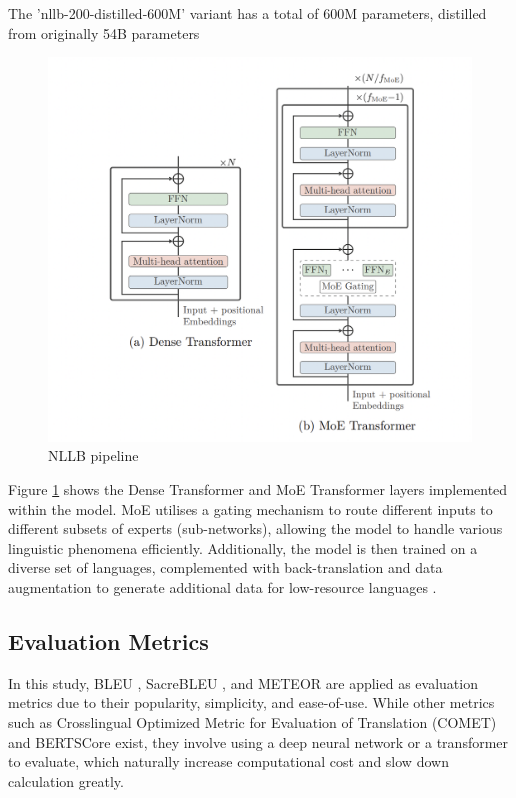 \documentclass[a4paper, 11pt]{article}
\begin{document}
The 'nllb-200-distilled-600M' variant has a total of 600M parameters, distilled from originally 54B parameters \cite{nllb200-2020}

\begin{figure}[htbp]
    \centering
    \includegraphics[width=0.7\linewidth]{images/nllb.png}
    \caption{NLLB pipeline \cite{nllb200-2020}}
    \label{fig:nllb}
\end{figure}

Figure \ref{fig:nllb} shows the Dense Transformer and MoE Transformer layers implemented within the model. MoE \cite{masoudnia-2012-moe} utilises a gating mechanism to route different inputs to different subsets of experts (sub-networks), allowing the model to handle various linguistic phenomena efficiently. Additionally, the model is then trained on a diverse set of languages, complemented with back-translation and data augmentation to generate additional data for low-resource languages \cite{nllb200-2020}.



\subsection{Evaluation Metrics}

In this study, BLEU \cite{papieni-2002-bleu}, SacreBLEU \cite{post-2018-sacrebleu}, and METEOR \cite{lavie-2007-meteor} are applied as evaluation metrics due to their popularity, simplicity, and ease-of-use. While other metrics such as Crosslingual Optimized Metric for Evaluation of Translation (COMET) \cite{rei-2020-comet} and BERTSCore \cite{zhang-2020-bertscore} exist, they involve using a deep neural network or a transformer to evaluate, which naturally increase computational cost and slow down calculation greatly.
\end{document}
